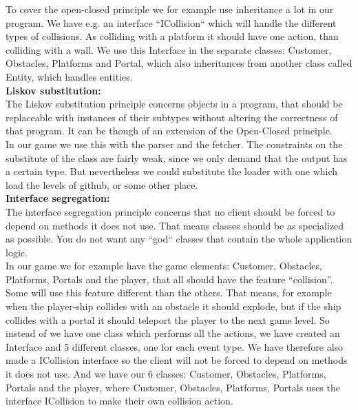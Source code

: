 \documentclass[../master.tex]{subfile}
\begin{document}
\noindent To cover the open-closed principle we for example use inheritance a lot in our program. We have e.g. an interface ``ICollision`` which will handle the different types of collisions. As colliding with a platform it should have one action, than colliding with a wall. We use this Interface in the separate classes: Customer, Obstacles, Platforms and Portal, which also inheritances from another class called Entity, which handles entities.\\

\noindent\textbf{Liskov substitution:}\\
The Liskov substitution principle concerns objects in a program, that should be replaceable with instances of their subtypes without altering the correctness of that program. It can be though of an extension of the Open-Closed principle.  
\\

\noindent In our game we use this with the parser and the fetcher. The constraints on the substitute of the class are fairly weak, since we only demand that the output has a certain type. But nevertheless we could substitute the loader with one which load the levels of github, or some other place.
\\

\noindent\textbf{Interface segregation:}\\
The interface segregation principle concerns that no client should be forced to depend on methods it does not use. That means classes should be as specialized as possible. You do not want any ``god`` classes that contain the whole application logic.\\

\noindent In our game we for example have the game elements: Customer, Obstacles, Platforms, Portals and the player, that all should have the feature ``collision''. Some will use this feature different than the others. That means, for example when the player-ship collides with an obstacle it should explode, but if the ship collides with a portal it should teleport the player to the next game level. So instead of we have one class which performs all the actions, we have created an Interface and 5 different classes, one for each event type. We have therefore also made a ICollision interface so the client will not be forced to depend on methods it does not use. And we have our 6 classes: Customer, Obstacles, Platforms, Portals and the player, where Customer, Obstacles, Platforms, Portals uses the interface ICollision to make their own collision action.\\
\end{document}
